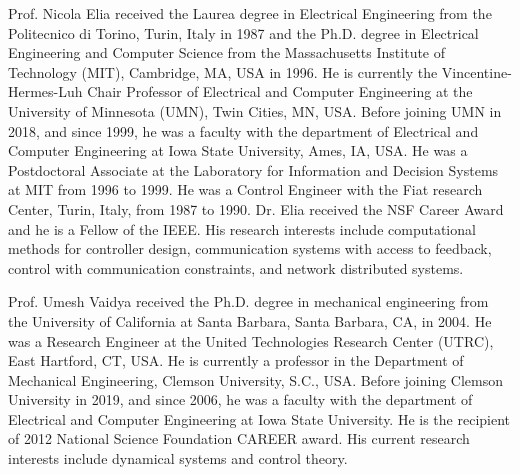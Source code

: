 \documentclass[journal,twoside,web]{ieeecolor}
\begin{document}
\begin{IEEEbiography}
{Prof. Nicola Elia} received the Laurea degree in Electrical Engineering from the Politecnico di Torino, Turin, Italy in 1987 and the Ph.D. degree in Electrical Engineering and Computer Science from the Massachusetts Institute of Technology (MIT), Cambridge, MA, USA in 1996. He is currently the Vincentine-Hermes-Luh Chair Professor of Electrical and Computer Engineering at the University of Minnesota (UMN), Twin Cities, MN, USA. Before joining UMN in 2018, and since 1999, he was a faculty with the department of Electrical and Computer Engineering at Iowa State University, Ames, IA, USA. He was a Postdoctoral Associate at the Laboratory for Information and Decision Systems at MIT from 1996 to 1999. He was a Control Engineer with the Fiat research Center, Turin, Italy, from 1987 to 1990. Dr. Elia received the NSF Career Award and he is a Fellow of the IEEE. His research interests include computational methods for controller design, communication systems with access to feedback, control with communication constraints, and network distributed systems.
\end{IEEEbiography}

\begin{IEEEbiography}
{Prof. Umesh Vaidya} received the Ph.D. degree in mechanical engineering from the University of California at Santa Barbara, Santa Barbara, CA, in
2004. He was a Research Engineer at the United Technologies Research Center (UTRC), East Hartford, CT, USA. He is currently a professor in the Department of Mechanical Engineering, Clemson University, S.C., USA. Before joining Clemson University in 2019, and since 2006, he was a faculty with the department of Electrical and Computer Engineering at Iowa State University. He is the recipient of 2012 National Science Foundation CAREER award. His current research interests include dynamical systems and control theory.
\end{IEEEbiography}
\end{document}
